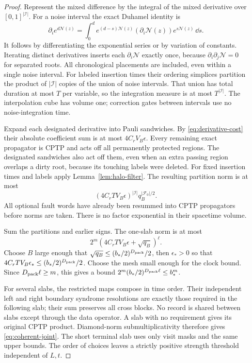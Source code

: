 \begin{proof}
Represent the mixed difference by the integral of the mixed
derivative over \([0,1]^{|\mathcal I|}\).
For a noise interval the exact Duhamel identity is
\[
 \partial_i e^{d\mathcal N(z)}
 =\int_0^d e^{(d-s)\mathcal N(z)}
       (\partial_i\mathcal N(z))e^{s\mathcal N(z)}\,\dd s .
\]
It follows by differentiating the exponential series or by
variation of constants. Iterating distinct derivatives inserts
each \(\partial_i\mathcal N\) exactly once, because
\(\partial_i\partial_j\mathcal N=0\) for separated roots.
All chronological placements are included, even within a
single noise interval. For labeled insertion times their
ordering simplices partition the product of
\(|\mathcal I|\) copies of the union of noise intervals.
That union has total duration at most \(T\) per variable,
so the integration measure is at most \(T^{|\mathcal I|}\).
The interpolation cube has volume one; correction gates
between intervals use no noise-integration time.

Expand each designated derivative into Pauli sandwiches.
By \eqref{eq:derivative-cost} their absolute coefficient
sum is at most \(4C_rV_B\epsilon\).
Every remaining exact propagator is CPTP and acts off all
permanently protected regions. The designated sandwiches
also act off them, even when an extra passing region overlaps
a dirty root, because its touching labels were deleted.
For fixed insertion times and labels apply
Lemma~\ref{lem:halo-filter}. The resulting partition norm is
at most
\[
 (4C_rTV_B\epsilon)^{|\mathcal I|}
                       q_B^{|\mathcal F_0|/2}.
\]
All optional fault words have already been resummed into
CPTP propagators before norms are taken.
There is no factor exponential in their spacetime volume.

Sum the partitions and earlier signs. The one-slab norm
is at most
\[
 2^m(4C_rTV_B\epsilon+\sqrt{q_B})^\ell .
\]
Choose \(B\) large enough that
\(\sqrt{q_B}\le(b_*/2)^{D_{\rm pack}}/2\), then
\(\epsilon_*>0\) so that
\(4C_rTV_B\epsilon_*\le(b_*/2)^{D_{\rm pack}}/2\).
Choose the mesh small enough for the clock bound.
Since \(D_{\rm pack}\ell\ge m\), this gives a bound
\(2^m(b_*/2)^{D_{\rm pack}\ell}\le b_*^m\).

For several slabs, the restricted maps compose in time
order. Their independent left and right boundary syndrome
resolutions are exactly those required in the following
slab; their sum preserves all cross blocks.
No record is shared between slabs except through the data
operator. A slab with no requirement gives its original
CPTP product. Diamond-norm submultiplicativity therefore
gives \eqref{eq:coherent-joint}. The short terminal slab
uses only visit masks and the same upper bounds.
The order of choices leaves a strictly positive strength
threshold independent of \(L,t\).
\end{proof}

